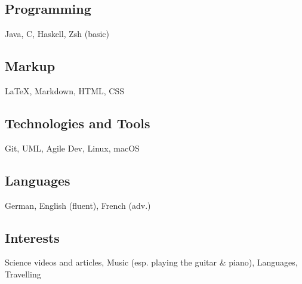 \documentclass[]{jonas-cv}
\begin{document}
\begin{minipage}[t]{0.34\textwidth}
\tinysectionsep
\subsection{Programming}
Java, C, Haskell, Zsh (basic)\\
\sectionsep

\subsection{Markup}
\LaTeX, Markdown, HTML, CSS\\
\sectionsep

\subsection{Technologies and Tools}
Git, UML, Agile Dev, Linux, macOS\\
\sectionsep

\subsection{Languages}
German, English (fluent), French (adv.)\\
\sectionsep
\subsection{Interests}
Science videos and articles, Music (esp. playing the guitar \& piano), Languages, Travelling

%
%

\end{minipage} 
\hfill
\end{document}
